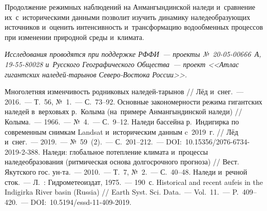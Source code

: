 Продолжение режимных наблюдений на Анмангындинской наледи и~сравнение их~с~историческими данными позволит изучить динамику наледеобразующих источников и~оценить интенсивность и~трансформацию водообменных процессов при изменении природной среды и~климата.

\textit{Исследования проводятся при поддержке РФФИ~--- проекты №~20-05-00666~А, 19-55-80028 и~Русского Географического Общества~--- проект <<Атлас гигантских наледей-тарынов Северо-Востока России>>.}

\begin{thebibliography}{99}
\bibitem{} Многолетняя изменчивость родниковых наледей-тарынов // Лёд и~снег.~--- 2016.~--- Т.~56, №~1.~--- С.~73--92.
\bibitem{} Основные закономерности режима гигантских наледей в~верховьях р.~Колыма (на~примере Анмангындинской наледи) // Колыма.~--- 1966.~--- №~4.~--- С.~9--12.
\bibitem{} Наледи бассейна р.~Индигирка по современным снимкам Landsat и~историческим данным c~2019~г. // Лёд и~снег.~--- 2019.~--- №~59~(2).~--- С.~201--212.~--- DOI:~10.15356/2076-6734-2019-2-388.
\bibitem{} Наледи: глобальное потепление климата и~процессы наледеобразования (ритмическая основа долгосрочного прогноза) // Вест. Якутского гос. ун-та.~--- 2010.~--- Т.~7, №~2.~--- С.~40--48.
\bibitem{} Наледи и~речной сток.~--- Л.~: Гидрометеоиздат, 1975.~--- 190~с.
\bibitem{} Historical and recent aufeis in the Indigirka River basin (Russia) // Earth Syst. Sci. Data.~--- Vol.~11.~--- P.~409--420.~--- DOI:~10.5194/essd-11-409-2019.
\end{thebibliography}
